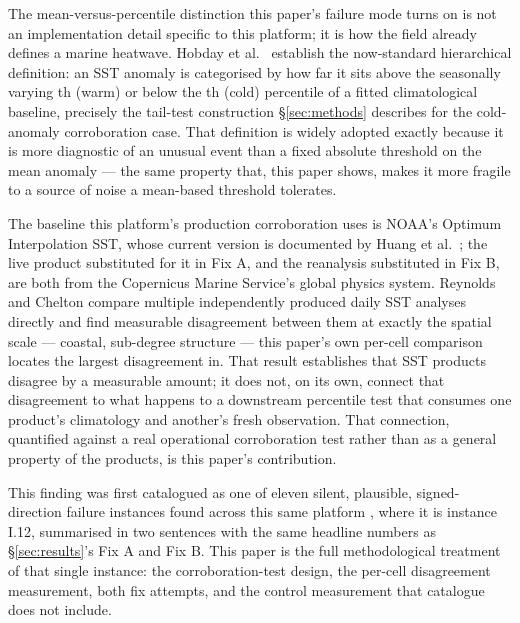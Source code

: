  The
mean-versus-percentile distinction this paper's failure mode turns on is not
an implementation detail specific to this platform; it is how the field
already defines a marine heatwave. Hobday et al.\ \citep{hobday2016} establish
the now-standard hierarchical definition: an SST anomaly is categorised by how
far it sits above the seasonally varying \ClimPercentileWarm{}th (warm) or
below the \ClimPercentile{}th (cold) percentile of a fitted climatological
baseline, precisely the tail-test construction \S\ref{sec:methods} describes
for the cold-anomaly corroboration case. That definition is widely adopted
exactly because it is more diagnostic of an unusual event than a fixed
absolute threshold on the mean anomaly --- the same property that, this paper
shows, makes it more fragile to a source of noise a mean-based threshold
tolerates.

 The baseline this platform's
production corroboration uses is NOAA's Optimum Interpolation SST, whose
current version is documented by Huang et al.\ \citep{huang2021oisst}; the
live product substituted for it in Fix A, and the reanalysis substituted in
Fix B, are both from the Copernicus Marine Service's global physics system.
Reynolds and Chelton \citep{reynolds2010} compare multiple independently
produced daily SST analyses directly and find measurable disagreement between
them at exactly the spatial scale --- coastal, sub-degree structure --- this
paper's own per-cell comparison locates the largest disagreement in. That
result establishes that SST products disagree by a measurable amount; it does
not, on its own, connect that disagreement to what happens to a downstream
percentile test that consumes one product's climatology and another's fresh
observation. That connection, quantified against a real operational
corroboration test rather than as a general property of the products, is
this paper's contribution.

 This finding was first catalogued as one of eleven
silent, plausible, signed-direction failure instances found across this same
platform \citep{silentfailures2026}, where it is instance I.12, summarised in
two sentences with the same headline numbers as \S\ref{sec:results}'s Fix A
and Fix B. This paper is the full methodological treatment of that single
instance: the corroboration-test design, the per-cell disagreement
measurement, both fix attempts, and the control measurement that catalogue
does not include.

